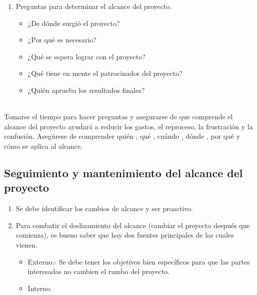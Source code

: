 \documentclass[10pt]{book}
\begin{document}
\begin{enumerate}[\bfseries 1.]
    \item Preguntas para determinar el alcance del proyecto.
    \begin{itemize}
	\item ¿De dónde surgió el proyecto?
	\item ¿Por qué es necesario?
	\item ¿Qué se espera lograr con el proyecto?
	\item ¿Qué tiene en mente el patrocinador del proyecto?
	\item ¿Quién aprueba los resultados finales?\\\\
    \end{itemize}
\end{enumerate}
    Tomarse el tiempo para hacer preguntas y asegurarse de que comprende el alcance del proyecto ayudará a reducir los gastos, el reproceso, la frustración y la confusión. Asegúrese de comprender quién , qué , cuándo , dónde , por qué y cómo se aplica al alcance.\\

    \subsection{Seguimiento y mantenimiento del alcance del proyecto}
    \begin{enumerate}[\bfseries 1.]
	\item Se debe identificar los cambios de alcance y ser proactivo.
	\item Para combatir el deslizamiento del alcance (cambiar el proyecto después que comienza), es bueno saber que hay dos fuentes principales de las cuales vienen.
	\begin{itemize}
	    \item Externo.- Se debe tener los objetivos bien específicos para que las partes interesadas no cambien el rumbo del proyecto.
	    \item Interno.
	\end{itemize}
    \end{enumerate}
\end{document}

